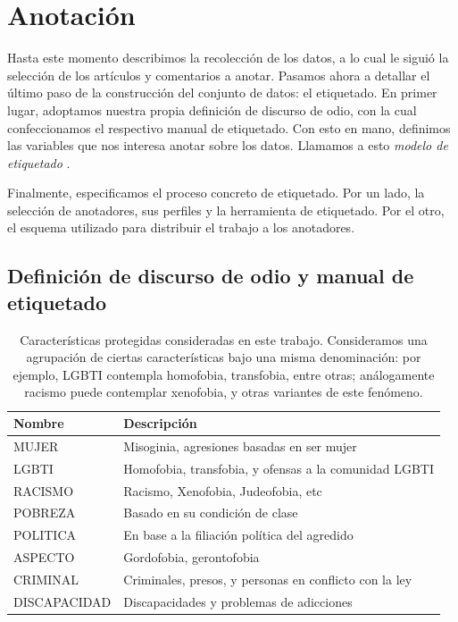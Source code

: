 \section{Anotación}

Hasta este momento describimos la recolección de los datos, a lo cual le siguió la selección de los artículos y comentarios a anotar. Pasamos ahora a detallar el último paso de la construcción del conjunto de datos: el etiquetado. En primer lugar, adoptamos nuestra propia definición de discurso de odio, con la cual confeccionamos el respectivo manual de etiquetado. Con esto en mano, definimos las variables que nos interesa anotar sobre los datos. Llamamos a esto \emph{modelo de etiquetado} \cite{pustejovsky2012natural}.

Finalmente, especificamos el proceso concreto de etiquetado. Por un lado, la selección de anotadores, sus perfiles y la herramienta de etiquetado. Por el otro, el esquema utilizado para distribuir el trabajo a los anotadores.



\subsection{Definición de discurso de odio y manual de etiquetado}
\label{sec:05_hate_speech_definition}
\begin{table}[b]
    \centering
    \small
    \begin{tabular}{p{} p{}}
        Nombre & Descripción \\
        \hline
        MUJER        & Misoginia, agresiones basadas en ser mujer  \\
        LGBTI        & Homofobia, transfobia, y ofensas a la comunidad LGBTI \\
        RACISMO      & Racismo, Xenofobia, Judeofobia, etc \\
        POBREZA      & Basado en su condición de clase \\
        POLITICA     & En base a la filiación política del agredido \\
        ASPECTO      & Gordofobia, gerontofobia \\
        CRIMINAL     & Criminales, presos, y personas en conflicto con la ley \\
        DISCAPACIDAD & Discapacidades y problemas de adicciones \\
        \hline
    \end{tabular}
    \caption{Características protegidas consideradas en este trabajo. Consideramos una agrupación de ciertas características bajo una misma denominación: por ejemplo, LGBTI contempla homofobia, transfobia, entre otras; análogamente racismo puede contemplar xenofobia, y otras variantes de este fenómeno. }
    \label{tab:caracteristicas_protegidas}
\end{table}


